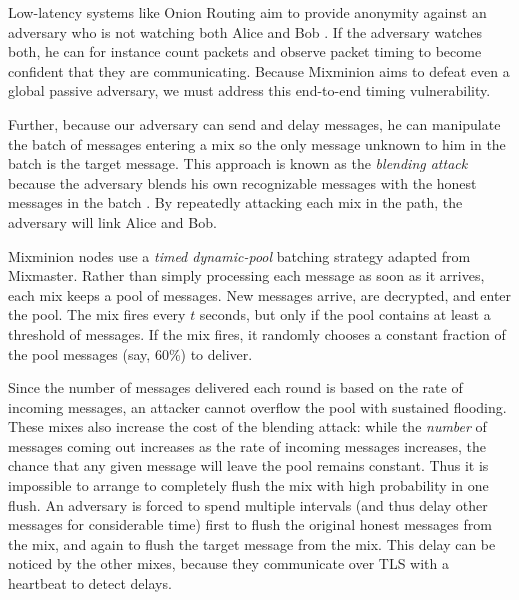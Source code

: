 \documentclass[times,10pt,twocolumn]{article}
\begin{document}
\label{sec:maintaining-anonymity}

\label{subsec:batching}

Low-latency systems like Onion Routing aim to provide anonymity against an
adversary who is not watching both Alice and Bob \cite{syverson_2000}. If
the adversary watches both, he can for instance count packets and observe
packet timing to become confident that they are communicating. Because
Mixminion aims to defeat even a global passive adversary, we must address
this end-to-end timing vulnerability.

Further, because our adversary can send and delay messages,
he can manipulate the batch of messages entering a mix so the only message
unknown to him in the batch is the target message. This approach is
known as the \emph{blending attack} because the adversary blends his
own recognizable messages with the honest messages in the batch
\cite{trickle02}. By repeatedly
attacking each mix in the path, the adversary will link Alice and Bob.

Mixminion nodes use a \emph{timed dynamic-pool} batching strategy
\cite{trickle02} adapted from Mixmaster. Rather than simply
processing each message as soon as it arrives, each mix keeps a pool of
messages. New messages arrive, are decrypted, and enter the pool. The
mix fires every $t$ seconds, but only if the pool contains at least a
threshold of messages. If the mix fires, it randomly chooses a constant
fraction of the pool messages (say, 60\%) to deliver.

Since the number of messages delivered each round is based on the rate of
incoming messages, an attacker cannot overflow the pool with sustained
flooding. These mixes also increase the cost of the blending attack:
while the \emph{number} of messages coming out increases as the rate
of incoming messages increases, the chance that any given message will
leave the pool remains constant. Thus it is impossible to arrange to
completely flush the mix with high probability in one flush. An adversary
is forced to spend multiple intervals (and thus delay other messages
for considerable time) first to flush the original honest messages from
the mix, and again to flush the target message from the mix. 
This delay
can be noticed by the other mixes, because they communicate over TLS
with a heartbeat to detect delays.
\end{document}
